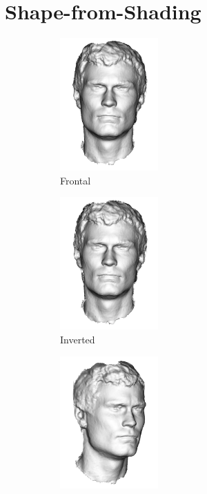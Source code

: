 \section{Shape-from-Shading}\label{ch:bg_sfs}
\begin{figure}[t]
	\centering
	\begin{subfigure}[b]{0.24\textwidth}
		\centering
		\includegraphics[height=2in]{background/images/frontal}
		\caption*{Frontal}
	\end{subfigure}
	\begin{subfigure}[b]{0.24\textwidth}
		\centering
		\includegraphics[height=2in]{background/images/invert}
		\caption*{Inverted}
	\end{subfigure}
	\begin{subfigure}[b]{0.24\textwidth}
		\centering
		\includegraphics[height=2in]{background/images/frontal_rotate}

\end{subfigure}
\end{figure}
